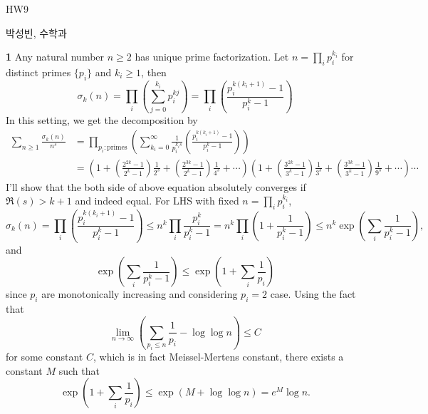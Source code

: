 \documentclass[a4paper, 12pt]{article}
\theoremstyle{Mydefinition}
\theoremstyle{Mytheorem}
\begin{document}
\thispagestyle{myfirstpage}
\begin{center}
	\Large{HW9}
\end{center}
박성빈, 수학과

\noindent \textbf{1} Any natural number $n\geq 2$ has unique prime factorization. Let $n=\prod_{i} p_i^{k_i}$ for distinct primes $\{p_i\}$ and $k_i\geq 1$, then
\begin{equation}
    \sigma_k(n) = \prod_i\left(\sum_{j=0}^{k_i} p_i^{kj}\right) = \prod_i\left(\frac{p_i^{k(k_i+1)}-1}{p_i^k-1}\right)
\end{equation}
In this setting, we get the decomposition by
\begin{equation}
\begin{split}
    \sum_{n\geq 1}\frac{\sigma_k(n)}{n^s} &= \prod_{p_i:\textrm{primes}}\left(\sum_{k_i=0}^\infty \frac{1}{p_i^{k_is}}\left(\frac{p_i^{k(k_i+1)}-1}{p_i^k-1}\right)\right)\\
    &=\left(1+\left(\frac{2^{2k}-1}{2^k-1}\right)\frac{1}{2^s} + \left(\frac{2^{3k}-1}{2^k-1}\right)\frac{1}{4^s} + \cdots\right)\left(1+\left(\frac{3^{2k}-1}{3^k-1}\right)\frac{1}{3^s} + \left(\frac{3^{3k}-1}{3^k-1}\right)\frac{1}{9^s} + \cdots\right)\cdots
\end{split}
\end{equation}
I'll show that the both side of above equation absolutely converges if $\Re(s)>k+1$ and indeed equal. For LHS with fixed $n=\prod_{i} p_i^{k_i}$,
\begin{equation}
    \sigma_k(n) = \prod_i\left(\frac{p_i^{k(k_i+1)}-1}{p_i^k-1}\right)\leq n^k\prod_i \frac{p_i^k}{p_i^k-1} = n^k\prod_i \left(1+\frac{1}{p_i^k-1}\right) \leq n^k \exp\left(\sum_{i}\frac{1}{p_i^k-1}\right),
\end{equation}
and
\begin{equation}
    \exp\left(\sum_{i}\frac{1}{p_i^k-1}\right)\leq \exp\left(1+\sum_{i}\frac{1}{p_i}\right)
\end{equation}
since $p_i$ are monotonically increasing and considering $p_i=2$ case. Using the fact that 
\begin{equation}
    \lim_{n\rightarrow \infty}\left(\sum_{p_i\leq n}\frac{1}{p_i}-\log\log n\right) \leq C
\end{equation}
for some constant $C$, which is in fact Meissel-Mertens constant, there exists a constant $M$ such that
\begin{equation}
    \exp\left(1+\sum_{i}\frac{1}{p_i}\right)\leq \exp\left(M+\log\log n\right) = e^M \log n.
\end{equation}
\end{document}
